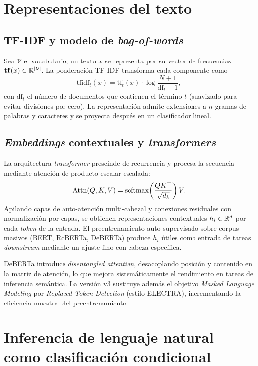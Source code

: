 \section{Representaciones del texto}

\subsection{TF-IDF y modelo de \emph{bag-of-words}}

Sea $\mathcal{V}$ el vocabulario; un texto $x$ se representa por su
vector de frecuencias $\mathbf{tf}(x) \in \mathbb{R}^{|\mathcal{V}|}$. La
ponderación TF-IDF transforma cada componente como
\[
  \text{tfidf}_t(x) = \mathrm{tf}_t(x) \cdot
  \log \frac{N + 1}{\mathrm{df}_t + 1},
\]
con $\mathrm{df}_t$ el número de documentos que contienen el término
$t$ (suavizado para evitar divisiones por cero). La representación
admite extensiones a $n$-gramas de palabras y caracteres y se proyecta
después en un clasificador lineal.

\subsection{\emph{Embeddings} contextuales y \emph{transformers}}

La arquitectura \emph{transformer} \citep{vaswani2017attention} prescinde
de recurrencia y procesa la secuencia mediante atención de producto
escalar escalada:
\[
  \operatorname{Attn}(Q, K, V) = \operatorname{softmax}\!\left(
    \frac{QK^\top}{\sqrt{d_k}}
  \right) V.
\]
Apilando capas de auto-atención multi-cabezal y conexiones residuales
con normalización por capas, se obtienen representaciones contextuales
$h_i \in \mathbb{R}^d$ por cada \emph{token} de la entrada. El preentrenamiento
auto-supervisado sobre corpus masivos (BERT, RoBERTa, DeBERTa) produce
$h_i$ útiles como entrada de tareas \emph{downstream} mediante un
ajuste fino con cabeza específica.

DeBERTa \citep{he2021deberta} introduce \emph{disentangled attention},
desacoplando posición y contenido en la matriz de atención, lo que
mejora sistemáticamente el rendimiento en tareas de inferencia
semántica. La versión v3 \citep{he2023debertav3} sustituye además el
objetivo \emph{Masked Language Modeling} por \emph{Replaced Token
Detection} (estilo ELECTRA), incrementando la eficiencia muestral del
preentrenamiento.

\section{Inferencia de lenguaje natural como clasificación condicional}

